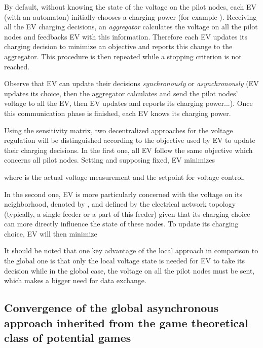 \documentclass[journal]{IEEEtran}
\begin{document}
By default, without knowing the state of the voltage on the pilot nodes, each EV (with an automaton) initially chooses a charging power (for example ). Receiving all the EV charging decisions, an \textit{aggregator} calculates the voltage on all the pilot nodes and feedbacks EV with this information. Therefore each EV updates its charging decision to minimize an objective and reports this change to the aggregator. This procedure is then repeated while a stopping criterion is not reached.

Observe that EV can update their decisions \textit{synchronously} or \textit{asynchronously} (EV  updates its choice, then the aggregator calculates and send the pilot nodes' voltage to all the EV, then EV  updates and reports its charging power...). Once this communication phase is finished, each EV knows its charging power. 

Using the sensitivity matrix, two decentralized approaches for the voltage regulation will be distinguished according to the objective used by EV to update their charging decisions. In the first one, all EV follow the same objective which concerns all pilot nodes. Setting  and supposing  fixed, EV  minimizes

where  is the actual voltage measurement and  the setpoint for voltage control. 



In the second one, EV  is more particularly concerned with the voltage on its neighborhood, denoted by , and defined by the electrical network topology (typically, a single feeder or a part of this feeder) given that its charging choice can more directly influence the state of these nodes. To update its charging choice, EV  will then minimize


It should be noted that one key advantage of the local approach in comparison to the global one is that only the local voltage state is needed for EV  to take its decision while in the global case, the voltage on all the pilot nodes must be sent, which makes a bigger need for data exchange.

\subsection{Convergence of the global asynchronous approach inherited from the game theoretical class of potential games}
\end{document}

